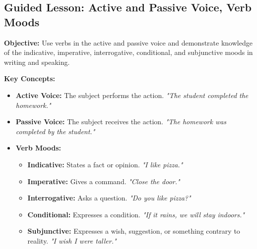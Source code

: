 \documentclass[12pt]{article}
\title{}
\date{}
\begin{document}
\subsection*{Guided Lesson: Active and Passive Voice, Verb Moods}
\onehalfspacing

\begin{tcolorbox}[colframe=black!40, colback=gray!5, 
coltitle=black, colbacktitle=black!20, fonttitle=\bfseries\Large, 
title=Learning Objective, halign title=center, left=5pt, right=5pt, top=5pt, bottom=15pt]
\textbf{Objective:} Use verbs in the active and passive voice and demonstrate knowledge of the indicative, imperative, interrogative, conditional, and subjunctive moods in writing and speaking.
\end{tcolorbox}

\vspace{1em}

\begin{tcolorbox}[colframe=black!60, colback=white, 
coltitle=black, colbacktitle=black!15, fonttitle=\bfseries\Large, 
title=Key Concepts and Vocabulary, halign title=center, left=10pt, right=10pt, top=10pt, bottom=15pt]
\textbf{Key Concepts:}
\begin{itemize}
    \item \textbf{Active Voice:} The subject performs the action. \textit{"The student completed the homework."}
    \item \textbf{Passive Voice:} The subject receives the action. \textit{"The homework was completed by the student."}
    \item \textbf{Verb Moods:}
    \begin{itemize}
        \item \textbf{Indicative:} States a fact or opinion. \textit{"I like pizza."}
        \item \textbf{Imperative:} Gives a command. \textit{"Close the door."}
        \item \textbf{Interrogative:} Asks a question. \textit{"Do you like pizza?"}
        \item \textbf{Conditional:} Expresses a condition. \textit{"If it rains, we will stay indoors."}
        \item \textbf{Subjunctive:} Expresses a wish, suggestion, or something contrary to reality. \textit{"I wish I were taller."}
    \end{itemize}
\end{itemize}
\end{tcolorbox}
\end{document}
